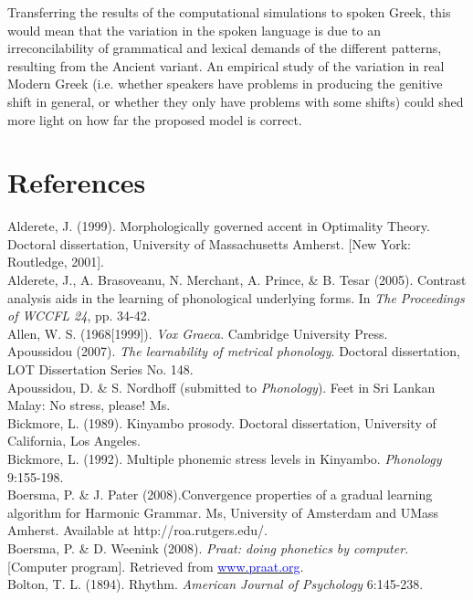 \documentclass[a4paper]{article}
\newcommand\textstyleInternetlink[1]{\textcolor{blue}{#1}}
\begin{document}
Transferring the results of the computational simulations to spoken Greek, this would mean that the variation in the spoken language is due to an irreconcilability of grammatical and lexical demands of the different patterns, resulting from the Ancient variant. An empirical study of the variation in real Modern Greek (i.e. whether speakers have problems in producing the genitive shift in general, or whether they only have problems with some shifts) could shed more light on how far the proposed model is correct.

\section{\bfseries
References}

Alderete, J. (1999). Morphologically governed accent in Optimality Theory. Doctoral dissertation, University of Massachusetts Amherst. [New York: Routledge, 2001].\\\noindent
Alderete, J., A. Brasoveanu, N. Merchant, A. Prince, \& B. Tesar (2005). Contrast analysis aids in the learning of phonological underlying forms. In \textit{The Proceedings of WCCFL 24}, pp. 34-42.\\\noindent
Allen, W. S. (1968[1999]). {\textit{Vox Graeca}}. Cambridge University Press.\\\noindent
Apoussidou (2007). \textit{The learnability of metrical phonology}. Doctoral dissertation, LOT Dissertation Series No. 148.\\\noindent
Apoussidou, D. \& S. Nordhoff (submitted to \textit{Phonology}). Feet in Sri Lankan Malay: No stress, please! Ms.\\\noindent
Bickmore, L. (1989). Kinyambo prosody. Doctoral dissertation, University of California, Los Angeles.\\\noindent
Bickmore, L. (1992). Multiple phonemic stress levels in Kinyambo. \textit{Phonology} 9:155-198.\\\noindent
Boersma, P. \& J. Pater (2008).{Convergence properties of a gradual learning algorithm for Harmonic Grammar. Ms, University of Amsterdam and UMass Amherst. Available at http://roa.rutgers.edu/.}\\\noindent
Boersma, P. \& D. Weenink (2008). {\textit{Praat: doing phonetics by computer}}. [Computer program]. Retrieved from \href{http://www.praat.org/}{\textstyleInternetlink{www.praat.org}}.\\\noindent
Bolton, T. L. (1894). Rhythm. \textit{American Journal of Psychology} 6:145-238.\\\noindent
\end{document}
